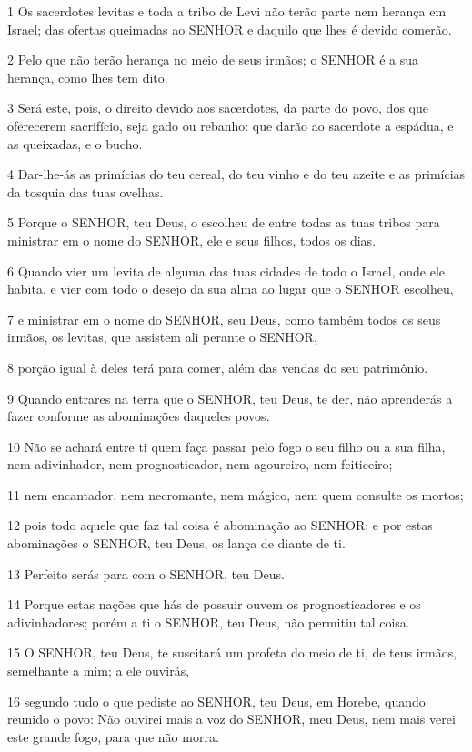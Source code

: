 \par 1 Os sacerdotes levitas e toda a tribo de Levi não terão parte nem herança em Israel; das ofertas queimadas ao SENHOR e daquilo que lhes é devido comerão.
\par 2 Pelo que não terão herança no meio de seus irmãos; o SENHOR é a sua herança, como lhes tem dito.
\par 3 Será este, pois, o direito devido aos sacerdotes, da parte do povo, dos que oferecerem sacrifício, seja gado ou rebanho: que darão ao sacerdote a espádua, e as queixadas, e o bucho.
\par 4 Dar-lhe-ás as primícias do teu cereal, do teu vinho e do teu azeite e as primícias da tosquia das tuas ovelhas.
\par 5 Porque o SENHOR, teu Deus, o escolheu de entre todas as tuas tribos para ministrar em o nome do SENHOR, ele e seus filhos, todos os dias.
\par 6 Quando vier um levita de alguma das tuas cidades de todo o Israel, onde ele habita, e vier com todo o desejo da sua alma ao lugar que o SENHOR escolheu,
\par 7 e ministrar em o nome do SENHOR, seu Deus, como também todos os seus irmãos, os levitas, que assistem ali perante o SENHOR,
\par 8 porção igual à deles terá para comer, além das vendas do seu patrimônio.
\par 9 Quando entrares na terra que o SENHOR, teu Deus, te der, não aprenderás a fazer conforme as abominações daqueles povos.
\par 10 Não se achará entre ti quem faça passar pelo fogo o seu filho ou a sua filha, nem adivinhador, nem prognosticador, nem agoureiro, nem feiticeiro;
\par 11 nem encantador, nem necromante, nem mágico, nem quem consulte os mortos;
\par 12 pois todo aquele que faz tal coisa é abominação ao SENHOR; e por estas abominações o SENHOR, teu Deus, os lança de diante de ti.
\par 13 Perfeito serás para com o SENHOR, teu Deus.
\par 14 Porque estas nações que hás de possuir ouvem os prognosticadores e os adivinhadores; porém a ti o SENHOR, teu Deus, não permitiu tal coisa.
\par 15 O SENHOR, teu Deus, te suscitará um profeta do meio de ti, de teus irmãos, semelhante a mim; a ele ouvirás,
\par 16 segundo tudo o que pediste ao SENHOR, teu Deus, em Horebe, quando reunido o povo: Não ouvirei mais a voz do SENHOR, meu Deus, nem mais verei este grande fogo, para que não morra.
